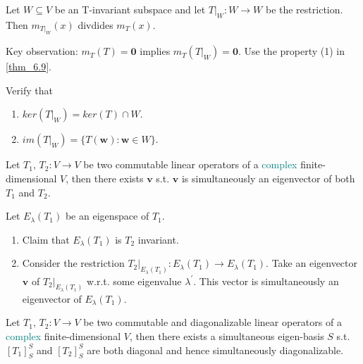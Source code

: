 \documentclass[12pt]{article}
\begin{document}
\begin{theorem}
    Let $W\subseteq V$ be an T-invariant subspace and let $T|_{W}:W\rightarrow W$ be the restriction. Then $m_{T|_{W}}(x)$ divdides $m_T(x)$.
\end{theorem}

\begin{pfbox}
   Key observation: $m_{T}(T)=\mathbf{0}$ implies $m_{T}(T|_{W})=\mathbf{0}$. Use the property (1) in \eqref{thm_6.9}. 
\end{pfbox}

\begin{exercise}
    Verify that 
    \begin{enumerate}
        \item $ker(T|_{W})=ker(T)\cap W$.
        \item $im(T|_{W})=\{T(\mathbf{w}):\mathbf{w}\in W\}.$
    \end{enumerate}
\end{exercise}

\begin{theorem}
    Let $T_1,\,T_2: V\rightarrow V$ be two commutable linear operators of a \textcolor{teal}{complex} finite-dimensional $V$, then there exists $\mathbf{v}$ s.t. $\mathbf{v}$ is simultaneously an eigenvector of both $T_1$ and $T_2$.
\end{theorem}

\begin{pfbox}
    Let $E_\lambda(T_1)$ be an eigenspace of $T_1$.
    \begin{enumerate}
        \item Claim that $E_\lambda(T_1)$ is $T_2$ invariant.
        \item Consider the restriction $T_2|_{E_\lambda(T_1)}:E_\lambda(T_1)\rightarrow E_\lambda(T_1)$. Take an eigenvector $\mathbf{v}$ of $T_2|_{E_\lambda(T_1)}$ w.r.t. some eigenvalue $\lambda^\prime$. This vector is simultaneously an eigenvector of $E_\lambda(T_1)$.
    \end{enumerate}
\end{pfbox}


\begin{theorem}
    Let $T_1,\,T_2: V\rightarrow V$ be two commutable and diagonalizable linear operators of a \textcolor{teal}{complex} finite-dimensional $V$, 
    then there exists a simultaneous eigen-basis $S$ s.t. $[T_1]^{S}_{S}$ and $[T_2]^{S}_{S}$ are both diagonal and hence simultaneously diagonalizable.
\end{theorem}
\end{document}
